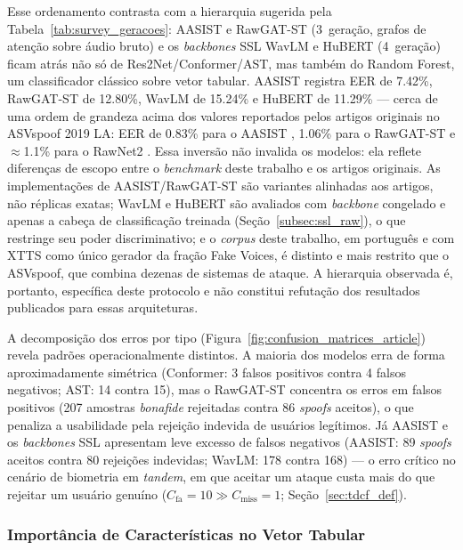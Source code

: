 \documentclass[12pt,a4paper]{article}
\begin{document}
Esse ordenamento contrasta com a hierarquia sugerida pela
Tabela~\ref{tab:survey_geracoes}: AASIST e RawGAT-ST (3\textordfeminine\
geração, grafos de atenção sobre áudio bruto) e os \textit{backbones} SSL WavLM
e HuBERT (4\textordfeminine\ geração) ficam atrás não só de
Res2Net/Conformer/AST, mas também do Random Forest, um classificador clássico
sobre vetor tabular. AASIST registra EER de \num{7,42}\%, RawGAT-ST de
\num{12,80}\%, WavLM de \num{15,24}\% e HuBERT de \num{11,29}\% --- cerca de
uma ordem de grandeza acima dos valores reportados pelos artigos originais no
ASVspoof 2019 LA: EER de \num{0,83}\% para o AASIST \cite{jung2022aasist},
\num{1,06}\% para o RawGAT-ST \cite{tak2021rawgatst} e $\approx$\num{1,1}\%
para o RawNet2 \cite{tak2021rawnet2}.
Essa inversão não invalida os modelos: ela reflete diferenças de escopo entre o
\textit{benchmark} deste trabalho e os artigos originais. As implementações de
AASIST/RawGAT-ST são variantes alinhadas aos artigos, não réplicas exatas; WavLM
e HuBERT são avaliados com \textit{backbone} congelado e apenas a cabeça de
classificação treinada (Seção~\ref{subsec:ssl_raw}), o que restringe seu poder
discriminativo; e o \textit{corpus} deste trabalho, em português e com XTTS como
único gerador da fração Fake Voices, é distinto e mais restrito que o ASVspoof,
que combina dezenas de sistemas de ataque. A hierarquia observada é, portanto,
específica deste protocolo e não constitui refutação dos resultados publicados
para essas arquiteturas.

A decomposição dos erros por tipo
(Figura~\ref{fig:confusion_matrices_article}) revela padrões operacionalmente
distintos. A maioria dos modelos erra de forma aproximadamente simétrica
(Conformer: \num{3} falsos positivos contra \num{4} falsos negativos; AST:
\num{14} contra \num{15}), mas o RawGAT-ST concentra os erros em falsos
positivos (\num{207} amostras \textit{bonafide} rejeitadas contra \num{86}
\textit{spoofs} aceitos), o que penaliza a usabilidade pela rejeição indevida
de usuários legítimos. Já AASIST e os \textit{backbones} SSL apresentam leve
excesso de falsos negativos (AASIST: \num{89} \textit{spoofs} aceitos contra
\num{80} rejeições indevidas; WavLM: \num{178} contra \num{168}) --- o erro
crítico no cenário de biometria em \textit{tandem}, em que aceitar um ataque
custa mais do que rejeitar um usuário genuíno
($C_{\text{fa}} = 10 \gg C_{\text{miss}} = 1$; Seção~\ref{sec:tdcf_def}).

\subsubsection*{Importância de Características no Vetor Tabular}
\end{document}
